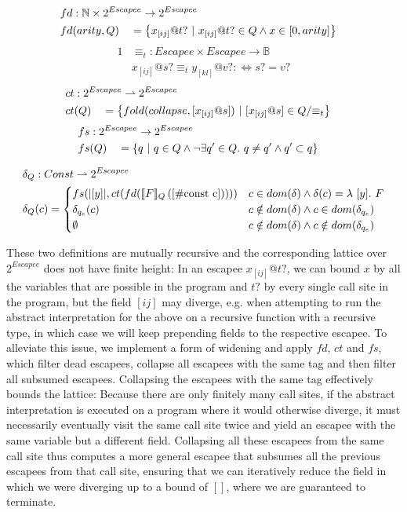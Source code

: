 \begin{alignat*}{3}
	fd &: \mathrlap{\mathbb{N} \times 2^{Escapee} \to 2^{Escapee}} \\
	fd&(arity, Q) &&= \left\{x_{[ij]}@t? \ |\ x_{[ij]}@t? \in Q \land x \in [0, arity] \right\}
\end{alignat*}
\begin{alignat*}{1}
	&\equiv_t : Escapee \times Escapee \to \mathbb{B} \\
	&x_{[ij]} @ s? \equiv_t y_{[kl]} @ v? :\Leftrightarrow s? = v?
\end{alignat*}
\begin{alignat*}{3}
	ct &: \mathrlap{2^{Escapee} \rightharpoonup 2^{Escapee}} \\
	ct&(Q) &&= \left\{fold(collapse, [x_{[ij]} @ s])\ |\ [x_{[ij]} @ s] \in Q/{\equiv_t} \right\}
\end{alignat*}
\begin{alignat*}{3}
	fs &: \mathrlap{2^{Escapee} \to 2^{Escapee}} \\
	fs&(Q) &&= \left\{q \ |\ q \in Q \land \lnot \exists q' \in Q.\ q \neq q' \land q' \subset q\right\}
\end{alignat*}

\begin{align*}
	\delta_Q &: \mathrlap{Const \rightharpoonup 2^{Escapee}} \\
	\delta_Q&(c) = \begin{cases}
		fs(|[y]|, ct(fd(\ecp{F}{[\#\text{const c}]}))) & c \in dom(\delta) \land \delta(c) = \lambda\ [y].\ F \\
		\delta_{q_e}(c) & c \notin dom(\delta) \land c \in dom(\delta_{q_e}) \\
		\emptyset & c \notin dom(\delta) \land c \notin dom(\delta_{q_e})
	\end{cases}
\end{align*}

These two definitions are mutually recursive and the corresponding lattice over $2^{Escapee}$ does not have finite height: In an escapee $x_{[ij]} @ t?$, we can bound $x$ by all the variables that are possible in the program and $t?$ by every single call site in the program, but the field $[ij]$ may diverge, e.g. when attempting to run the abstract interpretation for the above on a recursive function with a recursive type, in which case we will keep prepending fields to the respective escapee. To alleviate this issue, we implement a form of widening and apply $fd$, $ct$ and $fs$, which filter dead escapees, collapse all escapees with the same tag and then filter all subsumed escapees. Collapsing the escapees with the same tag effectively bounds the lattice: Because there are only finitely many call sites, if the abstract interpretation is executed on a program where it would otherwise diverge, it must necessarily eventually visit the same call site twice and yield an escapee with the same variable but a different field. Collapsing all these escapees from the same call site thus computes a more general escapee that subsumes all the previous escapees from that call site, ensuring that we can iteratively reduce the field in which we were diverging up to a bound of $[]$, where we are guaranteed to terminate.

